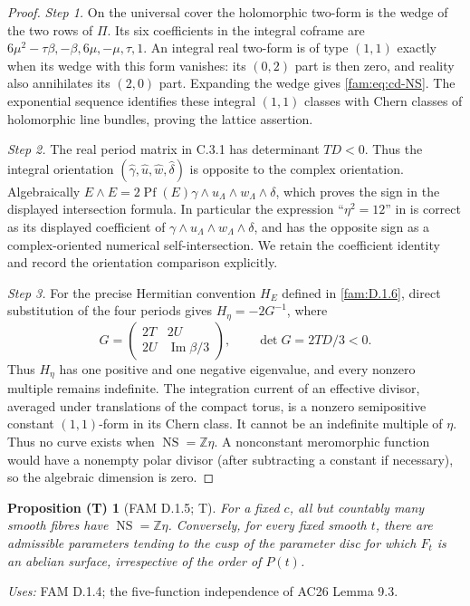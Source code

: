 \documentclass[11pt,a4paper]{article}
\theoremstyle{plain}
\newtheorem{proposition}[theorem]{Proposition (T)}
\theoremstyle{definition}
\begin{document}
\begin{proof}
\par\noindent\textit{Step 1.} On the universal cover the holomorphic two-form is the wedge of the two
rows of \(\Pi\). Its six coefficients in the integral coframe are
\(6\mu^2-\tau\beta,-\beta,6\mu,-\mu,\tau,1\).
An integral real two-form is of type \((1,1)\) exactly when its wedge
with this form vanishes: its \((0,2)\) part is then zero, and reality
also annihilates its \((2,0)\) part. Expanding the wedge gives
\eqref{fam:eq:cd-NS}. The exponential sequence identifies these integral
\((1,1)\) classes with Chern classes of holomorphic line bundles, proving
the lattice assertion.

\par\noindent\textit{Step 2.} The real period matrix in C.3.1 has determinant \(TD<0\). Thus the
integral orientation \((\widehat\gamma,\widehat u,\widehat w,
\widehat\delta)\) is opposite to the complex orientation. Algebraically
\(E\wedge E=2\operatorname{Pf}(E)\gamma\wedge u_{\Lambda}\wedge w_{\Lambda}\wedge\delta\),
which proves the sign in the displayed intersection formula. In
particular the expression ``\(\eta^2=12\)'' in \cite[Lemma~9.4]{AC26} is correct
as its displayed coefficient of \(\gamma\wedge u_{\Lambda}\wedge w_{\Lambda}\wedge\delta\),
and has the opposite sign as a complex-oriented numerical
self-intersection. We retain the coefficient identity and record the
orientation comparison explicitly.

\par\noindent\textit{Step 3.} For the precise Hermitian convention $H_E$ defined in \ref{fam:D.1.6}, direct
substitution of the four periods gives $H_\eta=-2G^{-1}$, where
\[
 G=\begin{pmatrix}2T&2U\\2U&\operatorname{Im}\beta/3\end{pmatrix},
 \qquad \det G=2TD/3<0.
\]
Thus $H_\eta$ has one positive and one negative eigenvalue, and every
nonzero multiple remains indefinite. The integration
current of an effective divisor, averaged under translations of the
compact torus, is a nonzero semipositive constant \((1,1)\)-form in its
Chern class. It cannot be an indefinite multiple of \(\eta\).
Thus no curve exists when \(\operatorname{NS}=\mathbb Z\eta\).
A nonconstant meromorphic function would have a nonempty polar divisor
(after subtracting a constant if necessary), so the algebraic dimension
is zero.
\end{proof}

\begin{proposition}[FAM D.1.5; T]\label{fam:D.1.5}
For a fixed \(c\), all but countably many smooth fibres have
\(\operatorname{NS}=\mathbb Z\eta\). Conversely, for every fixed smooth
\(t\), there are admissible parameters tending to the cusp of the
parameter disc for which \(F_t\) is an abelian surface, irrespective of
the order of \(P(t)\).
\end{proposition}
\noindent\emph{Uses:} FAM D.1.4; the five-function independence of AC26 Lemma 9.3.\par
\end{document}
